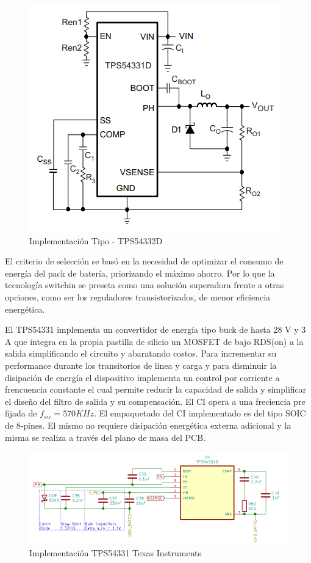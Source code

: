\documentclass[10pt,a4paper]{article}
\begin{document}
\begin{itemize}
\begin{figure}[h!]
    \begin{center}
	\includegraphics[width=0.4\linewidth]{assets/TPS54332D_common_implementation.png}
	\caption{Implementación Tipo - TPS54332D}
	\label{fig:TPS54332D_common_implementation}
    \end{center}	
\end{figure}

El criterio de selección se basó en la necesidad de optimizar el consumo de
energía del pack de batería, priorizando el máximo ahorro. Por lo que la
tecnología switchin se preseta como una solución superadora frente a otras
opciones, como ser los reguladores transistorizados, de menor eficiencia
energética.

El TPS54331 implementa un convertidor de energía tipo buck de hasta 28 V y 3 A
que integra en la propia pastilla de silicio un MOSFET de bajo RDS(on) a la
salida simplificando el circuito y abaratando costos.
Para incrementar su performance durante los transitorios de linea y carga y para
disminuir la disipación de energía el dispositivo implementa un control por
corriente a frencuencia constante el cual permite reducir la capacidad de salida
y simplificar el diseño del filtro de salida y su compensación. El \acrshort{CI}
opera a una freciencia pre fijada de $f_{sw}=570 KHz$.
El empaquetado del \acrshort{CI} implementado es del tipo SOIC de 8-pines. El
mismo no requiere disipación energética externa adicional y la misma se realiza
a través del plano de masa del \acrshort{PCB}.

\begin{figure}[h!]
    \centering
    \includegraphics[width=0.8\linewidth]{hardware/3v3/3v3_IC.png}
        \caption{Implementación TPS54331 Texas Instruments}
        \label{fig:3v3_IC}
\end{figure}
\FloatBarrier


\end{itemize}
\end{document}
